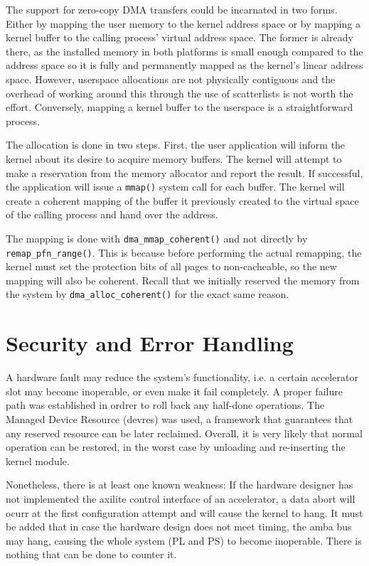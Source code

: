 The support for zero-copy DMA transfers could be incarnated in two forms. Either by mapping the
user memory to the kernel address space or by mapping a kernel buffer to the calling process'
virtual address space. The former is already there, as the installed memory in both platforms
is small enough compared to the address space so it is fully and permanently mapped as the
kernel's linear address space. However, userspace allocations are not physically contiguous
and the overhead of working around this through the use of \glspl{scatterlist} is not worth the effort.
Conversely, mapping a kernel buffer to the userspace is a straightforward process.

The allocation is done in two steps. First, the user application will inform the kernel 
about its desire to acquire memory buffers. The kernel will attempt to make a reservation
from the memory allocator and report the result. If successful, the application will issue
a \texttt{mmap()} system call for each buffer. The kernel will create a coherent mapping of the
buffer it previously created to the virtual space of the calling process and hand over the address.

The mapping is done with \texttt{dma\_mmap\_coherent()} and not directly by \texttt{remap\_pfn\_range()}.
This is because before performing the actual remapping, the kernel must set the protection bits of all pages
to non-cacheable, so the new mapping will also be coherent. Recall that we initially reserved
the memory from the system by \texttt{dma\_alloc\_coherent()} for the exact same reason.


\section{Security and Error Handling}

A hardware fault may reduce the system's functionality, i.e. a certain accelerator slot
may become inoperable, or even make it fail completely. 
A proper failure path was established in ordrer to roll back any half-done operations.
The Managed Device Resource (devres) was used, a framework that guarantees that
any reserved resource can be later reclaimed.
Overall, it is very likely that normal operation can be restored, in the worst case
by unloading and re-inserting the kernel module.

Nonetheless, there is at least one known weakness: If the hardware designer has not implemented
the \gls{axilite} control interface of an accelerator, a data abort will ocurr at the first
configuration attempt and will cause the kernel to hang. It must be added that in case
the hardware design does not meet timing, the \gls{amba} bus may hang, causing the whole system (PL and PS)
to become inoperable. There is nothing that can be done to counter it.

